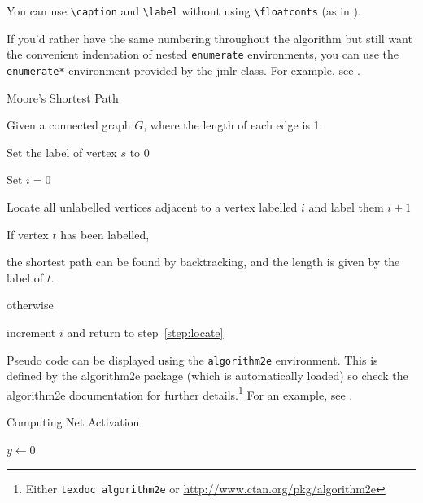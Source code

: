 \documentclass[pmlr]{jmlr}
\begin{document}
You can use \verb|\caption| and \verb|\label| without using
\verb|\floatconts| (as in ).

If you'd rather have the same numbering throughout the algorithm
but still want the convenient indentation of nested 
\texttt{enumerate} environments, you can use the
\texttt{enumerate*} environment provided by the \textsf{jmlr}
class. For example, see .

\begin{algorithm}
\caption{Moore's Shortest Path}\label{alg:moore}
Given a connected graph $G$, where the length of each edge is 1:
\begin{enumerate*}
  \item Set the label of vertex $s$ to 0
  \item Set $i=0$
  \begin{enumerate*}
    \item \label{step:locate}Locate all unlabelled vertices 
          adjacent to a vertex labelled $i$ and label them $i+1$
    \item If vertex $t$ has been labelled,
    \begin{enumerate*}
      \item[] the shortest path can be found by backtracking, and 
      the length is given by the label of $t$.
    \end{enumerate*}
    otherwise
    \begin{enumerate*}
      \item[] increment $i$ and return to step~\ref{step:locate}
    \end{enumerate*}
  \end{enumerate*}
\end{enumerate*}
\end{algorithm}

Pseudo code can be displayed using the \texttt{algorithm2e}
environment. This is defined by the \textsf{algorithm2e} package
(which is automatically loaded) so check the \textsf{algorithm2e}
documentation for further details.\footnote{Either \texttt{texdoc
algorithm2e} or \url{http://www.ctan.org/pkg/algorithm2e}}
For an example, see .

\begin{algorithm2e}
\caption{Computing Net Activation}
\label{alg:net}
{}
$y\leftarrow 0$\;
\end{algorithm2e}
\end{document}
